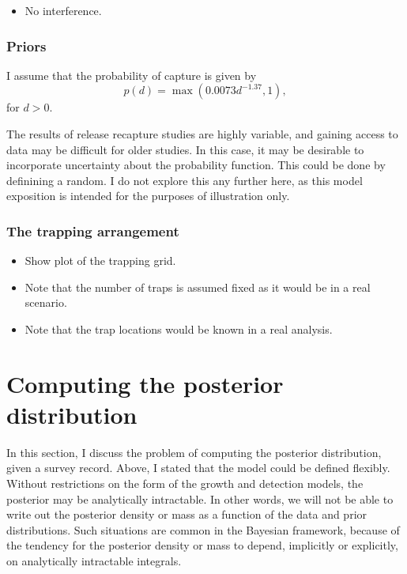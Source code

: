 \documentclass[
]{book}
\providecommand{\tightlist}{%
  \setlength{\itemsep}{0pt}\setlength{\parskip}{0pt}}
\begin{document}
\begin{itemize}
\tightlist
\item
  No interference.
\end{itemize}

\hypertarget{priors}{%
\subsubsection{Priors}\label{priors}}

I assume that the probability of capture is given by
\[
p(d) = \max(0.0073d^{-1.37}, 1),
\]
for \(d > 0\).

The results of release recapture studies are highly variable, and gaining access to data may be difficult for older studies. In this case, it may be desirable to incorporate uncertainty about the probability function. This could be done by definining a random. I do not explore this any further here, as this model exposition is intended for the purposes of illustration only.

\hypertarget{the-trapping-arrangement}{%
\subsubsection{The trapping arrangement}\label{the-trapping-arrangement}}

\begin{itemize}
\tightlist
\item
  Show plot of the trapping grid.
\item
  Note that the number of traps is assumed fixed as it would be in a real scenario.
\item
  Note that the trap locations would be known in a real analysis.
\end{itemize}

\hypertarget{computing-the-posterior-distribution}{%
\section{Computing the posterior distribution}\label{computing-the-posterior-distribution}}

In this section, I discuss the problem of computing the posterior distribution, given a survey record. Above, I stated that the model could be defined flexibly. Without restrictions on the form of the growth and detection models, the posterior may be analytically intractable. In other words, we will not be able to write out the posterior density or mass as a function of the data and prior distributions. Such situations are common in the Bayesian framework, because of the tendency for the posterior density or mass to depend, implicitly or explicitly, on analytically intractable integrals.
\end{document}
